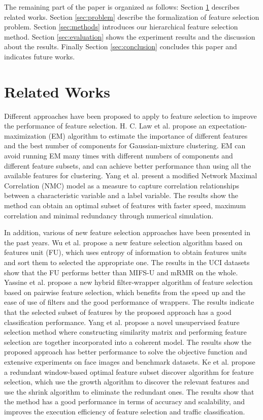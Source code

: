 \documentclass{ieeeaccess}
\theoremstyle{definition}
\begin{document}
The remaining part of the paper is organized as follows: Section \ref{sec:related} describes related works. Section \ref{sec:problem} describe the formalization of feature selection problem. Section \ref{sec:methods} introduces our hierarchical feature selection method. Section \ref{sec:evaluation} shows the experiment results and the discussion about the results. Finally Section \ref{sec:conclusion} concludes this paper and indicates future works.

\section{Related Works}
\label{sec:related}

Different approaches have been proposed to apply to feature selection to improve the performance of feature selection. H. C. Law et al. propose an expectation-maximization (EM) algorithm to estimate the importance of different features and the best number of components for Gaussian-mixture clustering\cite{Law2004}. EM can avoid running EM many times with different numbers of components and different feature subsets, and can achieve better performance than using all the available features for clustering. Yang et al.\cite{Yang2018} present a modified Network Maximal Correlation (NMC) model as a measure to capture correlation relationships between a characteristic variable and a label variable. The results show the method can obtain an optimal subset of features with faster speed, maximum correlation and minimal redundancy through numerical simulation.

In addition, various of new feature selection approaches have been presented in the past years. Wu et al. \cite{Wu2017}propose a new feature selection algorithm based on features unit (FU), which uses entropy of information to obtain features units and sort them to selected the appropriate one. The results in the UCI datasets show that the FU performs better than MIFS-U and mRMR on the whole. Yassine et al.\cite{Yassine2017} propose a new hybrid filter-wrapper algorithm of feature selection based on pairwise feature selection, which benefits from the speed up and the ease of use of filters and the good performance of wrappers. The results indicate that the selected subset of features by the proposed approach has a good classification performance. Yang et al. \cite{Yang2018a} propose a novel unsupervised feature selection method where constructing similarity matrix and performing feature selection are together incorporated into a coherent model. The results show the proposed approach has better performance to solve the objective function and extensive experiments on face images and benchmark datasets. Ke et al. \cite{Ke2018} propose a redundant window-based optimal feature subset discover algorithm for feature selection, which use the growth algorithm to discover the relevant features and use the shrink algorithm to eliminate the redundant ones. The results show that the method has a good performance in terms of accuracy and scalability, and improves the execution efficiency of feature selection and traffic classification.
\end{document}
